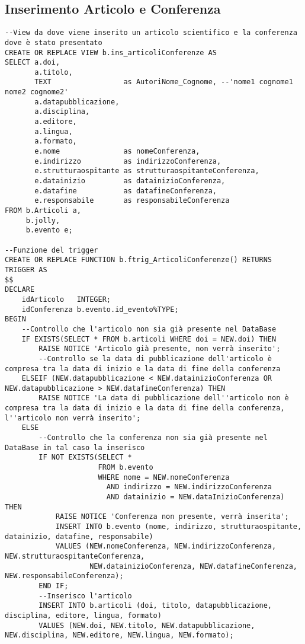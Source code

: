 \subsection{Inserimento Articolo e Conferenza}
\begin{lstlisting}
--View da dove viene inserito un articolo scientifico e la conferenza dove è stato presentato
CREATE OR REPLACE VIEW b.ins_articoliConferenze AS
SELECT a.doi,
       a.titolo,
       TEXT                 as AutoriNome_Cognome, --'nome1 cognome1 nome2 cognome2'
       a.datapubblicazione,
       a.disciplina,
       a.editore,
       a.lingua,
       a.formato,
       e.nome               as nomeConferenza,
       e.indirizzo          as indirizzoConferenza,
       e.strutturaospitante as strutturaospitanteConferenza,
       e.datainizio         as datainizioConferenza,
       e.datafine           as datafineConferenza,
       e.responsabile       as responsabileConferenza
FROM b.Articoli a,
     b.jolly,
     b.evento e;

--Funzione del trigger
CREATE OR REPLACE FUNCTION b.ftrig_ArticoliConferenze() RETURNS TRIGGER AS
$$
DECLARE
    idArticolo   INTEGER;
    idConferenza b.evento.id_evento%TYPE;
BEGIN
    --Controllo che l'articolo non sia già presente nel DataBase
    IF EXISTS(SELECT * FROM b.articoli WHERE doi = NEW.doi) THEN
        RAISE NOTICE 'Articolo già presente, non verrà inserito';
        --Controllo se la data di pubblicazione dell'articolo è compresa tra la data di inizio e la data di fine della conferenza
    ELSEIF (NEW.datapubblicazione < NEW.datainizioConferenza OR NEW.datapubblicazione > NEW.datafineConferenza) THEN
        RAISE NOTICE 'La data di pubblicazione dell''articolo non è compresa tra la data di inizio e la data di fine della conferenza, l''articolo non verrà inserito';
    ELSE
        --Controllo che la conferenza non sia già presente nel DataBase in tal caso la inserisco
        IF NOT EXISTS(SELECT *
                      FROM b.evento
                      WHERE nome = NEW.nomeConferenza
                        AND indirizzo = NEW.indirizzoConferenza
                        AND datainizio = NEW.dataInizioConferenza) THEN
            RAISE NOTICE 'Conferenza non presente, verrà inserita';
            INSERT INTO b.evento (nome, indirizzo, strutturaospitante, datainizio, datafine, responsabile)
            VALUES (NEW.nomeConferenza, NEW.indirizzoConferenza, NEW.strutturaospitanteConferenza,
                    NEW.datainizioConferenza, NEW.datafineConferenza, NEW.responsabileConferenza);
        END IF;
        --Inserisco l'articolo
        INSERT INTO b.articoli (doi, titolo, datapubblicazione, disciplina, editore, lingua, formato)
        VALUES (NEW.doi, NEW.titolo, NEW.datapubblicazione, NEW.disciplina, NEW.editore, NEW.lingua, NEW.formato);


\end{lstlisting}
